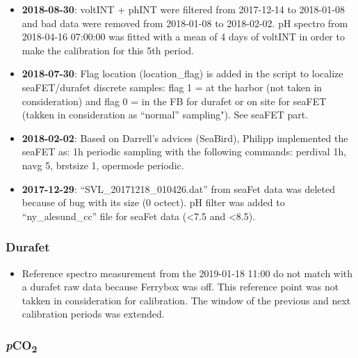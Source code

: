 \documentclass[
]{article}
\providecommand{\tightlist}{%
  \setlength{\itemsep}{0pt}\setlength{\parskip}{0pt}}
\begin{document}
\begin{itemize}
\tightlist
\item
  \textbf{2018-08-30}: voltINT + phINT were filtered from 2017-12-14 to
  2018-01-08 and bad data were removed from 2018-01-08 to 2018-02-02. pH
  spectro from 2018-04-16 07:00:00 was fitted with a mean of 4 days of
  voltINT in order to make the calibration for this 5th period.
\item
  \textbf{2018-07-30}: Flag location (location\_flag) is added in the
  script to localize seaFET/durafet discrete samples: flag 1 = at the
  harbor (not taken in consideration) and flag 0 = in the FB for durafet
  or on site for seaFET (takken in consideration as ``normal''
  sampling"). See seaFET part.
\item
  \textbf{2018-02-02}: Based on Darrell's advices (SeaBird), Philipp
  implemented the seaFET as: 1h periodic sampling with the following
  commands: perdival 1h, navg 5, brstsize 1, opermode periodic.
\item
  \textbf{2017-12-29}: ``SVL\_20171218\_010426.dat'' from seaFet data
  was deleted because of bug with its size (0 octect). pH filter was
  added to ``ny\_alesund\_cc'' file for seaFet data (\textless7.5 and
  \textless8.5).
\end{itemize}

\hypertarget{durafet-1}{%
\subsubsection{\texorpdfstring{\textbf{Durafet}}{Durafet}}\label{durafet-1}}

\begin{itemize}
\tightlist
\item
  Reference spectro measurement from the 2019-01-18 11:00 do not match
  with a durafet raw data because Ferrybox was off. This reference point
  was not takken in consideration for calibration. The window of the
  previous and next calibration periods was extended.
\end{itemize}

\hypertarget{pco2-2}{%
\subsubsection{\texorpdfstring{\textbf{\emph{p}CO\textsubscript{2}}}{pCO2}}\label{pco2-2}}
\end{document}
